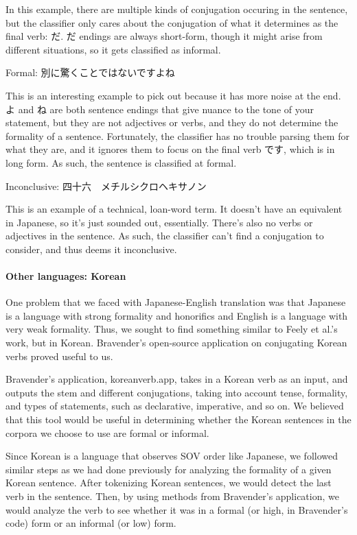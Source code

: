 \documentclass[11pt]{article}
\begin{document}
In this example, there are multiple kinds of conjugation occuring in the sentence, but the classifier only cares about the conjugation of what it determines as the final verb: だ. だ endings are always short-form, though it might arise from different situations, so it gets classified as informal.

Formal: 別に驚くことではないですよね 

This is an interesting example to pick out because it has more noise at the end. よ and ね are both sentence endings that give nuance to the tone of your statement, but they are not adjectives or verbs, and they do not determine the formality of a sentence. Fortunately, the classifier has no trouble parsing them for what they are, and it ignores them to focus on the final verb です, which is in long form. As such, the sentence is classified at formal.

Inconclusive: 四十六　メチルシクロヘキサノン

This is an example of a technical, loan-word term. It doesn't have an equivalent in Japanese, so it's just sounded out, essentially. There's also no verbs or adjectives in the sentence. As such, the classifier can't find a conjugation to consider, and thus deems it inconclusive.

\paragraph{Other languages: Korean}

One problem that we faced with Japanese-English translation was that Japanese is a language with strong formality and honorifics and English is a language with very weak formality. Thus, we sought to find something similar to Feely et al.'s work, but in Korean. Bravender's open-source application on conjugating Korean verbs proved useful to us.

Bravender's application, koreanverb.app, takes in a Korean verb as an input, and outputs the stem and different conjugations, taking into account tense, formality, and types of statements, such as declarative, imperative, and so on. We believed that this tool would be useful in determining whether the Korean sentences in the corpora we choose to use are formal or informal.

Since Korean is a language that observes SOV order like Japanese, we followed similar steps as we had done previously for analyzing the formality of a given Korean sentence. After tokenizing Korean sentences, we would detect the last verb in the sentence. Then, by using methods from Bravender's application, we would analyze the verb to see whether it was in a formal (or high, in Bravender's code) form or an informal (or low) form.
\end{document}
